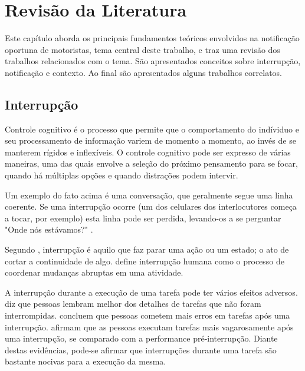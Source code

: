 
\chapter{Revisão da Literatura}
\label{revisao-lit}
Este capítulo aborda os principais fundamentos teóricos envolvidos na notificação oportuna de motoristas,
tema central deste trabalho, e traz uma revisão dos trabalhos relacionados com o tema. São apresentados
conceitos sobre interrupção, notificação e contexto. Ao final são apresentados alguns trabalhos correlatos.

\section{Interrupção}
\label{interrupcao}
Controle cognitivo é o processo que permite que o comportamento do indíviduo e seu processamento de informação variem de momento a
momento, ao invés de se manterem rígidos e inflexíveis. O controle cognitivo pode ser expresso de várias maneiras, uma das quais
envolve a seleção do próximo pensamento para se focar, quando há múltiplas opções e quando distrações podem intervir.

Um exemplo do fato acima é uma conversação, que geralmente segue uma linha coerente. Se uma interrupção ocorre (um dos celulares dos
interlocutores começa a tocar, por exemplo) esta linha pode ser perdida, levando-os a se perguntar "Onde nós estávamos?" \cite{altmann2014momentary}.

Segundo , interrupção é aquilo que faz parar uma ação ou um estado; o ato de cortar a continuidade de
algo.  define interrupção humana como o processo de coordenar mudanças abruptas em uma atividade.

A interrupção durante a execução de uma tarefa pode ter vários efeitos adversos.  diz
que pessoas lembram melhor dos detalhes de tarefas que não foram interrompidas.  concluem que
pessoas cometem mais erros em tarefas após uma interrupção.  afirmam que as pessoas executam tarefas
mais vagarosamente após uma interrupção, se comparado com a performance pré-interrupção. Diante destas evidências, pode-se
afirmar que interrupções durante uma tarefa são bastante nocivas para a execução da mesma.

